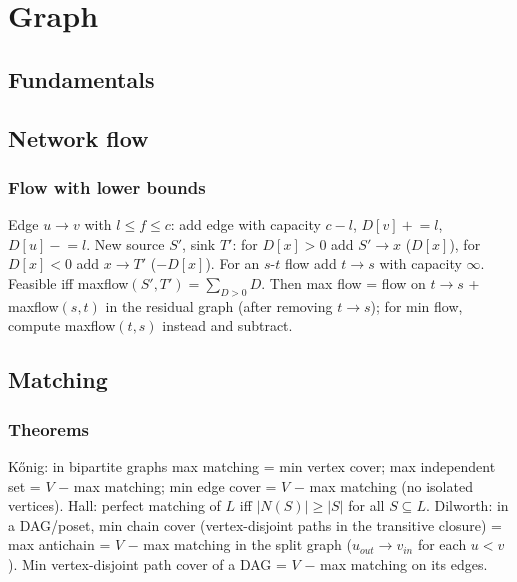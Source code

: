 \chapter{Graph}

\section{Fundamentals}

\section{Network flow}
	\subsection{Flow with lower bounds}
		Edge $u\to v$ with $l \le f \le c$: add edge with capacity $c-l$, $D[v] \mathrel{+}= l$, $D[u] \mathrel{-}= l$.
		New source $S'$, sink $T'$: for $D[x]>0$ add $S'\to x$ ($D[x]$), for $D[x]<0$ add $x \to T'$ ($-D[x]$).
		For an $s$-$t$ flow add $t\to s$ with capacity $\infty$. Feasible iff maxflow$(S',T') = \sum_{D>0} D$.
		Then max flow = flow on $t\to s$ + maxflow$(s,t)$ in the residual graph (after removing $t\to s$);
		for min flow, compute maxflow$(t,s)$ instead and subtract.

\section{Matching}
	\subsection{Theorems}
		K\H{o}nig: in bipartite graphs max matching = min vertex cover; max independent set = $V$ $-$ max matching;
		min edge cover = $V$ $-$ max matching (no isolated vertices).
		Hall: perfect matching of $L$ iff $|N(S)| \ge |S|$ for all $S \subseteq L$.
		Dilworth: in a DAG/poset, min chain cover (vertex-disjoint paths in the transitive closure) = max antichain
		= $V$ $-$ max matching in the split graph ($u_{out} \to v_{in}$ for each $u < v$).
		Min vertex-disjoint path cover of a DAG = $V$ $-$ max matching on its edges.

